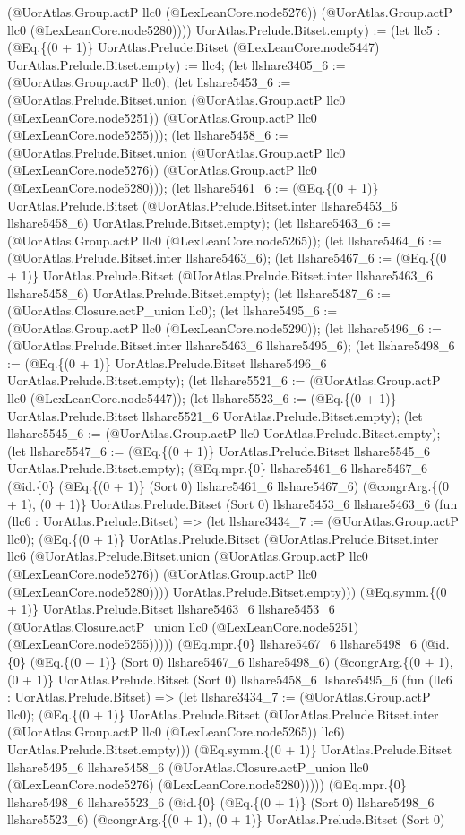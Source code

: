 \documentclass[11pt]{article}
\begin{document}
(@UorAtlas.Group.actP llc0 (@LexLeanCore.node5276)) (@UorAtlas.Group.actP llc0 (@LexLeanCore.node5280)))) UorAtlas.Prelude.Bitset.empty) := (let llc5 : (@Eq.\{(0 + 1)\} UorAtlas.Prelude.Bitset (@LexLeanCore.node5447) UorAtlas.Prelude.Bitset.empty) := llc4; (let llshare3405\_6 := (@UorAtlas.Group.actP llc0); (let llshare5453\_6 := (@UorAtlas.Prelude.Bitset.union (@UorAtlas.Group.actP llc0 (@LexLeanCore.node5251)) (@UorAtlas.Group.actP llc0 (@LexLeanCore.node5255))); (let llshare5458\_6 := (@UorAtlas.Prelude.Bitset.union (@UorAtlas.Group.actP llc0 (@LexLeanCore.node5276)) (@UorAtlas.Group.actP llc0 (@LexLeanCore.node5280))); (let llshare5461\_6 := (@Eq.\{(0 + 1)\} UorAtlas.Prelude.Bitset (@UorAtlas.Prelude.Bitset.inter llshare5453\_6 llshare5458\_6) UorAtlas.Prelude.Bitset.empty); (let llshare5463\_6 := (@UorAtlas.Group.actP llc0 (@LexLeanCore.node5265)); (let llshare5464\_6 := (@UorAtlas.Prelude.Bitset.inter llshare5463\_6); (let llshare5467\_6 := (@Eq.\{(0 + 1)\} UorAtlas.Prelude.Bitset (@UorAtlas.Prelude.Bitset.inter llshare5463\_6 llshare5458\_6) UorAtlas.Prelude.Bitset.empty); (let llshare5487\_6 := (@UorAtlas.Closure.actP\_union llc0); (let llshare5495\_6 := (@UorAtlas.Group.actP llc0 (@LexLeanCore.node5290)); (let llshare5496\_6 := (@UorAtlas.Prelude.Bitset.inter llshare5463\_6 llshare5495\_6); (let llshare5498\_6 := (@Eq.\{(0 + 1)\} UorAtlas.Prelude.Bitset llshare5496\_6 UorAtlas.Prelude.Bitset.empty); (let llshare5521\_6 := (@UorAtlas.Group.actP llc0 (@LexLeanCore.node5447)); (let llshare5523\_6 := (@Eq.\{(0 + 1)\} UorAtlas.Prelude.Bitset llshare5521\_6 UorAtlas.Prelude.Bitset.empty); (let llshare5545\_6 := (@UorAtlas.Group.actP llc0 UorAtlas.Prelude.Bitset.empty); (let llshare5547\_6 := (@Eq.\{(0 + 1)\} UorAtlas.Prelude.Bitset llshare5545\_6 UorAtlas.Prelude.Bitset.empty); (@Eq.mpr.\{0\} llshare5461\_6 llshare5467\_6 (@id.\{0\} (@Eq.\{(0 + 1)\} (Sort 0) llshare5461\_6 llshare5467\_6) (@congrArg.\{(0 + 1), (0 + 1)\} UorAtlas.Prelude.Bitset (Sort 0) llshare5453\_6 llshare5463\_6 (fun (llc6 : UorAtlas.Prelude.Bitset) => (let llshare3434\_7 := (@UorAtlas.Group.actP llc0); (@Eq.\{(0 + 1)\} UorAtlas.Prelude.Bitset (@UorAtlas.Prelude.Bitset.inter llc6 (@UorAtlas.Prelude.Bitset.union (@UorAtlas.Group.actP llc0 (@LexLeanCore.node5276)) (@UorAtlas.Group.actP llc0 (@LexLeanCore.node5280)))) UorAtlas.Prelude.Bitset.empty))) (@Eq.symm.\{(0 + 1)\} UorAtlas.Prelude.Bitset llshare5463\_6 llshare5453\_6 (@UorAtlas.Closure.actP\_union llc0 (@LexLeanCore.node5251) (@LexLeanCore.node5255))))) (@Eq.mpr.\{0\} llshare5467\_6 llshare5498\_6 (@id.\{0\} (@Eq.\{(0 + 1)\} (Sort 0) llshare5467\_6 llshare5498\_6) (@congrArg.\{(0 + 1), (0 + 1)\} UorAtlas.Prelude.Bitset (Sort 0) llshare5458\_6 llshare5495\_6 (fun (llc6 : UorAtlas.Prelude.Bitset) => (let llshare3434\_7 := (@UorAtlas.Group.actP llc0); (@Eq.\{(0 + 1)\} UorAtlas.Prelude.Bitset (@UorAtlas.Prelude.Bitset.inter (@UorAtlas.Group.actP llc0 (@LexLeanCore.node5265)) llc6) UorAtlas.Prelude.Bitset.empty))) (@Eq.symm.\{(0 + 1)\} UorAtlas.Prelude.Bitset llshare5495\_6 llshare5458\_6 (@UorAtlas.Closure.actP\_union llc0 (@LexLeanCore.node5276) (@LexLeanCore.node5280))))) (@Eq.mpr.\{0\} llshare5498\_6 llshare5523\_6 (@id.\{0\} (@Eq.\{(0 + 1)\} (Sort 0) llshare5498\_6 llshare5523\_6) (@congrArg.\{(0 + 1), (0 + 1)\} UorAtlas.Prelude.Bitset (Sort 0) 
\end{document}
